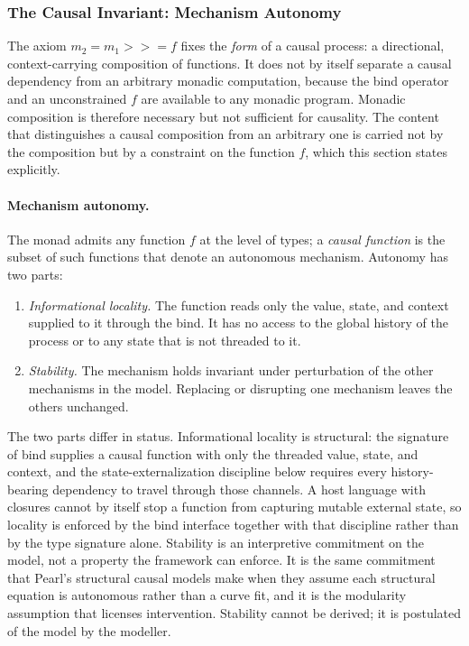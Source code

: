 \newpage  
   
\subsubsection{The Causal Invariant: Mechanism Autonomy}
\label{sub:epp_causal_invariant}

The axiom $m_2 = m_1 \mathbin{>\!\!>\!\!=} f$ fixes the \emph{form} of a causal process: a directional, context-carrying composition of functions. It does not by itself separate a causal dependency from an arbitrary monadic computation, because the bind operator and an unconstrained $f$ are available to any monadic program. Monadic composition is therefore necessary but not sufficient for causality. The content that distinguishes a causal composition from an arbitrary one is carried not by the composition but by a constraint on the function $f$, which this section states explicitly.

\paragraph{Mechanism autonomy.}
The monad admits any function $f$ at the level of types; a \emph{causal function} is the subset of such functions that denote an autonomous mechanism. Autonomy has two parts:

\begin{enumerate}
    \item \emph{Informational locality.} The function reads only the value, state, and context supplied to it through the bind. It has no access to the global history of the process or to any state that is not threaded to it.

    \item \emph{Stability.} The mechanism holds invariant under perturbation of the other mechanisms in the model. Replacing or disrupting one mechanism leaves the others unchanged.
\end{enumerate}

The two parts differ in status. Informational locality is structural: the signature of bind supplies a causal function with only the threaded value, state, and context, and the state-externalization discipline below requires every history-bearing dependency to travel through those channels. A host language with closures cannot by itself stop a function from capturing mutable external state, so locality is enforced by the bind interface together with that discipline rather than by the type signature alone. Stability is an interpretive commitment on the model, not a property the framework can enforce. It is the same commitment that Pearl's structural causal models make when they assume each structural equation is autonomous rather than a curve fit\cite{pearl2000causality}, and it is the modularity assumption that licenses intervention. Stability cannot be derived; it is postulated of the model by the modeller.

